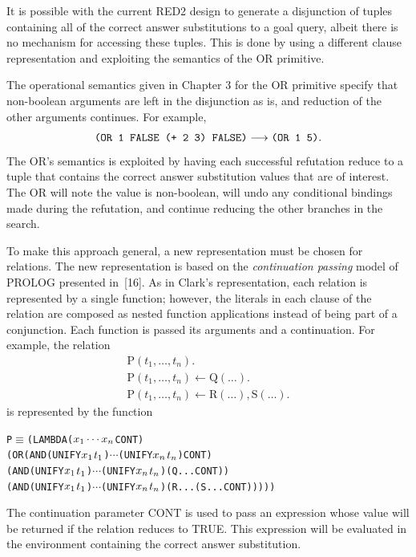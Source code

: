 It is possible with the current RED2 design to generate a disjunction of tuples
containing all of the correct answer substitutions to a goal query, albeit there
is no mechanism for accessing these tuples. This is done by using a different
clause representation and exploiting the semantics of the OR primitive.

The operational semantics given in Chapter 3 for the OR primitive specify that
non-boolean arguments are left in the disjunction as is, and reduction of the
other arguments continues. For example,
\[
\texttt{(OR 1 FALSE (+ 2 3) FALSE)}\longrightarrow\texttt{(OR 1 5)}.
\]
The OR's semantics is exploited by having each successful refutation reduce to a
tuple that contains the correct answer substitution values that are of interest.
The OR will note the value is non-boolean, will undo any conditional bindings
made during the refutation, and continue reducing the other branches in the
search.

To make this approach general, a new representation must be chosen for
relations. The new representation is based on the \emph{continuation passing} model of
PROLOG presented in~[16]. As in Clark's representation, each relation is
represented by a single function; however, the literals in each clause of the
relation are composed as nested function applications instead of being part of a
conjunction. Each function is passed its arguments and a continuation. For
example, the relation
\[
\begin{array}{l}
\mathrm{P}(t_1,\ldots,t_n).\\
\mathrm{P}(t_1,\ldots,t_n)\leftarrow \mathrm{Q}(\ldots).\\
\mathrm{P}(t_1,\ldots,t_n)\leftarrow \mathrm{R}(\ldots),\mathrm{S}(\ldots).
\end{array}
\]
is represented by the function
\par\smallskip\noindent\begin{minipage}{\linewidth}
\begin{alltt}
P \(\equiv\) (LAMBDA (\(x\sb{1} \cdots x\sb{n}\) CONT)
      (OR (AND (UNIFY \(x\sb{1}\) \(t\sb{1}\)) \(\cdots\) (UNIFY \(x\sb{n}\) \(t\sb{n}\)) CONT)
          (AND (UNIFY \(x\sb{1}\) \(t\sb{1}\)) \(\cdots\) (UNIFY \(x\sb{n}\) \(t\sb{n}\)) (Q ... CONT))
          (AND (UNIFY \(x\sb{1}\) \(t\sb{1}\)) \(\cdots\) (UNIFY \(x\sb{n}\) \(t\sb{n}\)) (R ... (S ... CONT)))))
\end{alltt}
\end{minipage}\par\smallskip
The continuation parameter CONT is used to pass an expression whose value will
be returned if the relation reduces to TRUE. This expression will be evaluated
in the environment containing the correct answer substitution.

